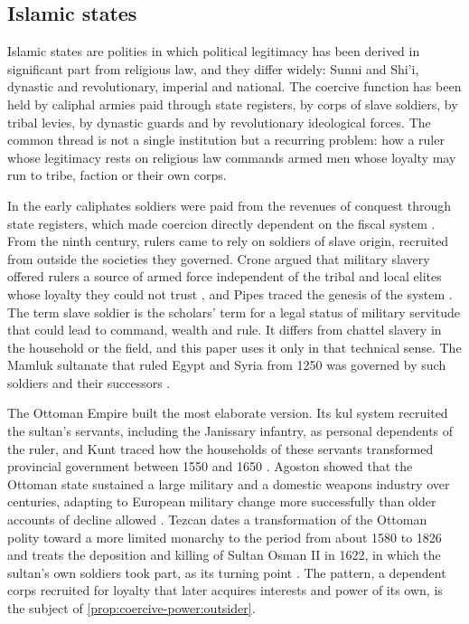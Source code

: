 \documentclass[11pt,letterpaper]{article}
\theoremstyle{definition}
\theoremstyle{remark}
\begin{document}
\subsection{Islamic states}
\label{sec:islamic}

Islamic states are polities in which political legitimacy has been derived in significant part from religious law, and they differ widely: Sunni and Shi'i, dynastic and revolutionary, imperial and national. The coercive function has been held by caliphal armies paid through state registers, by corps of slave soldiers, by tribal levies, by dynastic guards and by revolutionary ideological forces. The common thread is not a single institution but a recurring problem: how a ruler whose legitimacy rests on religious law commands armed men whose loyalty may run to tribe, faction or their own corps.

In the early caliphates soldiers were paid from the revenues of conquest through state registers, which made coercion directly dependent on the fiscal system \citep{kennedy2001}. From the ninth century, rulers came to rely on soldiers of slave origin, recruited from outside the societies they governed. Crone argued that military slavery offered rulers a source of armed force independent of the tribal and local elites whose loyalty they could not trust \citep{crone1980}, and Pipes traced the genesis of the system \citep{pipes1981}. The term slave soldier is the scholars' term for a legal status of military servitude that could lead to command, wealth and rule. It differs from chattel slavery in the household or the field, and this paper uses it only in that technical sense. The Mamluk sultanate that ruled Egypt and Syria from 1250 was governed by such soldiers and their successors \citep{irwin1986}.

The Ottoman Empire built the most elaborate version. Its kul system recruited the sultan's servants, including the Janissary infantry, as personal dependents of the ruler, and Kunt traced how the households of these servants transformed provincial government between 1550 and 1650 \citep{kunt1983}. Agoston showed that the Ottoman state sustained a large military and a domestic weapons industry over centuries, adapting to European military change more successfully than older accounts of decline allowed \citep{agoston2005,agoston2014}. Tezcan dates a transformation of the Ottoman polity toward a more limited monarchy to the period from about 1580 to 1826 and treats the deposition and killing of Sultan Osman II in 1622, in which the sultan's own soldiers took part, as its turning point \citep{tezcan2010}. The pattern, a dependent corps recruited for loyalty that later acquires interests and power of its own, is the subject of \cref{prop:coercive-power:outsider}.
\end{document}

